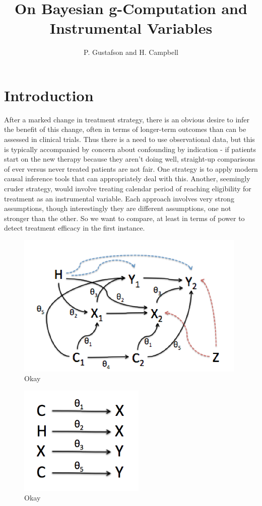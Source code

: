\documentclass[11pt]{amsart}
\title{On Bayesian g-Computation and Instrumental Variables}
\author{P. Gustafson  and H. Campbell}
\begin{document}
\maketitle
\section{Introduction}
\nocite{*}
After a marked change in treatment strategy, there is an obvious desire to infer the benefit of this change, often in terms of longer-term outcomes than can be assessed in clinical trials.
Thus there is a need to use observational data, but this is typically accompanied by concern about confounding by indication - if patients start on the new therapy because they aren't doing well, straight-up comparisons of ever versus never treated patients are not fair.   One strategy is to apply modern causal inference tools that can appropriately deal with this.  Another, seemingly cruder strategy, would involve treating calendar period of reaching eligibility for treatment as an instrumental variable.   Each approach involves very strong assumptions, though interestingly they are different assumptions, one not stronger than the other.  So we want to compare, at least in terms of power to detect treatment efficacy in the first instance.

\begin{figure}[h]
\includegraphics[width=11cm]{pic1.png}
\caption{Okay}
\centering
\end{figure}

\begin{figure}[h]
\includegraphics[width=6cm]{pic2.png}
\caption{Okay}
\centering
\end{figure}
\end{document}
